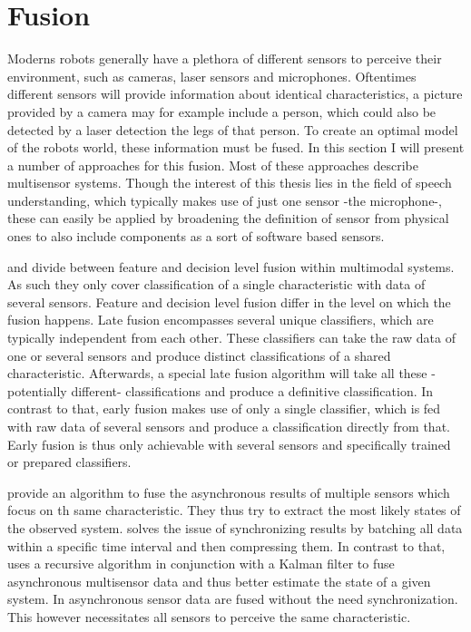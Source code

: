 
\section{Fusion}
\label{related:fusion}
Moderns robots generally have a plethora of different sensors to perceive their environment, such as cameras, laser sensors and microphones.
Oftentimes different sensors will provide information about identical characteristics, a picture provided by a camera may for example include a person, which could also be detected by a laser detection the legs of that person.
To create an optimal model of the robots world, these information must be fused.
In this section I will present a number of approaches for this fusion.
Most of these approaches describe multisensor systems.
Though the interest of this thesis lies in the field of speech understanding, which typically makes use of just one sensor -the microphone-, these can easily be applied by broadening the definition of sensor from physical ones to also include components as a sort of software based sensors.

\cite{TURK2014189} and \cite{PORIA201650} divide between feature and decision level fusion within multimodal systems.
As such they only cover classification of a single characteristic with data of several sensors.
Feature and decision level fusion differ in the level on which the fusion happens.
Late fusion encompasses several unique classifiers, which are typically independent from each other. 
These classifiers can take the raw data of one or several sensors and produce distinct classifications of a shared characteristic.
Afterwards, a special late fusion algorithm will take all these -potentially different- classifications and produce a definitive classification.
In contrast to that, early fusion makes use of only a single classifier, which is fed with raw data of several sensors and produce a classification directly from that.
Early fusion is thus only achievable with several sensors and specifically trained or prepared classifiers.

\cite{287895} provide an algorithm to fuse the asynchronous results of multiple sensors which focus on th same characteristic.
They thus try to extract the most likely states of the observed system.
\cite{10.1117/12.138164} solves the issue of synchronizing results by batching all data within a specific time interval and then compressing them. 
In contrast to that, \cite{4383603} uses a recursive algorithm in conjunction with a Kalman filter to fuse asynchronous multisensor data and thus better estimate the state of a given system.
In \cite{1468761} asynchronous sensor data are fused without the need synchronization.
This however necessitates all sensors to perceive the same characteristic.